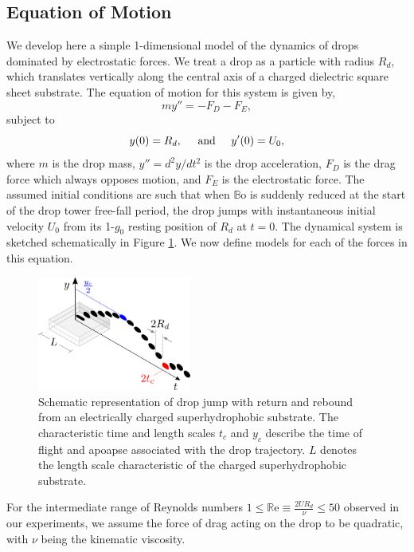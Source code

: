 \documentclass[aip,reprint, floatfix]{revtex4-1}
\begin{document}
\subsection{Equation of Motion}
We develop here a simple 1-dimensional model of the dynamics of drops dominated by electrostatic forces. We treat a drop as a particle with radius $R_d$, which translates vertically along the central axis of a charged dielectric square sheet substrate. The equation of motion for this system is given by,
\begin{equation}
m y'' = - F_D - F_E,
\label{gov_eqn}
\end{equation}
subject to
\begin{equation}
y(0) = R_d, \hspace{5 mm} \mbox{and} \hspace{5 mm} y'(0) = U_0,
\end{equation}
where $m$ is the drop mass, $y'' = d^2 y/d t^2$ is the drop acceleration, $F_D$ is the drag force which always opposes motion, and $F_E$ is the electrostatic force. The assumed initial conditions are such that when $\mathbb{B}\mbox{o}$ is suddenly reduced at the start of the drop tower free-fall period, the drop jumps with instantaneous initial velocity $U_0$ from its 1-$g_0$ resting position of $R_d$ at $t=0$. The dynamical system is sketched schematically in Figure \ref{fig:apparatus}. We now define models for each of the forces in this equation.

\begin{figure}[ht]
\centering
\includegraphics[width=0.45\textwidth]{../figures/apparatus3.pdf}
\caption{Schematic representation of drop jump with return and rebound from an electrically charged superhydrophobic substrate. The characteristic time and length scales $t_c$ and $y_c$ describe the time of flight and apoapse associated with the drop trajectory. $L$ denotes the length scale characteristic of the charged superhydrophobic substrate.}
\label{fig:apparatus}
\end{figure}

For the intermediate range of Reynolds numbers $1 \leq \mathbb{R}\mbox{e} \equiv \frac{2UR_d}{\nu} \leq 50 $ observed in our experiments, we assume the force of drag acting on the drop to be quadratic, with $\nu$ being the kinematic viscosity.
\end{document}
